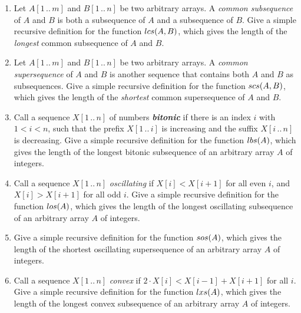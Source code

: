 \begin{exercises}
\item
\begin{enumerate}
\item Let $A[1\,..\,m]$ and $B[1\,..\,n]$ be two arbitrary arrays.
A \textit{common subsequence} of $A$ and $B$ is both a subsequence of $A$ and a subsequence of $B$.
Give a simple recursive definition for the function $lcs(A, B)$, which gives the length of the \textit{longest} common subsequence of $A$ and $B$.
\item Let $A[1\,..\,m]$ and $B[1\,..\,n]$ be two arbitrary arrays.
A \textit{common supersequence} of $A$ and $B$ is another sequence that contains both $A$ and $B$ as subsequences.
Give a simple recursive definition for the function $scs(A, B)$, which gives the length of the \textit{shortest} common supersequence of $A$ and $B$.
\item Call a sequence $X[1\,..\,n]$ of numbers \textbf{\textit{bitonic}} if there is an index $i$ with $1 < i < n$, such that the prefix $X[1\,..\,i]$ is increasing and the suffix $X[i\,..\,n]$ is decreasing.
Give a simple recursive definition for the function $lbs(A)$, which gives the length of the longest bitonic subsequence of an arbitrary array $A$ of integers.
\item Call a sequence $X[1\,..\,n]$ \textit{oscillating} if $X[i] < X[i+1]$ for all even $i$, and $X[i] > X[i+1]$ for all odd $i$.
Give a simple recursive definition for the function $los(A)$, which gives the length of the longest oscillating subsequence of an arbitrary array $A$ of integers.
\item Give a simple recursive definition for the function $sos(A)$, which gives the length of the shortest oscillating supersequence of an arbitrary array $A$ of integers.
\item Call a sequence $X[1\,..\,n]$ \textit{convex} if $2 \cdot X[i] < X[i-1] + X[i+1]$ for all $i$.
Give a simple recursive definition for the function $lxs(A)$, which gives the length of the longest convex subsequence of an arbitrary array $A$ of integers.
\end{enumerate}


\end{exercises}
